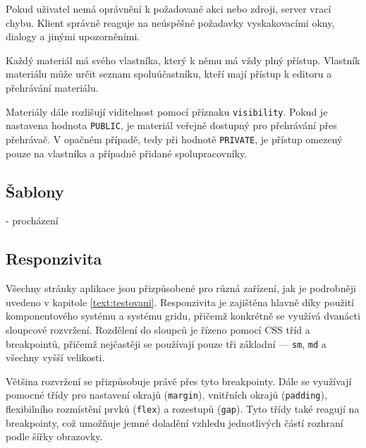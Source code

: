 Pokud uživatel nemá oprávnění k požadované akci nebo zdroji, server vrací chybu. 
Klient správně reaguje na neúspěšné požadavky vyskakovacími okny, dialogy a jinými upozorněními.

Každý materiál má svého vlastníka, který k němu má vždy plný přístup. 
Vlastník materiálu může určit seznam spoluúčastníku, kteří mají přístup k editoru a přehrávání materiálu.

Materiály dále rozlišují viditelnost pomocí příznaku \texttt{visibility}. 
Pokud je nastavena hodnota \texttt{PUBLIC}, je materiál veřejně dostupný pro přehrávání přes přehrávač. 
V opačném případě, tedy při hodnotě \texttt{PRIVATE}, je přístup omezený pouze na vlastníka a případně přidané spolupracovníky.



\subsection{Šablony}

- procházení

\subsection{Responzivita}


Všechny stránky aplikace jsou přizpůsobené pro různá zařízení, jak je podrobněji uvedeno v kapitole \ref{text:testovani}. 
Responzivita je zajištěna hlavně díky použití komponentového systému a systému gridu, přičemž konkrétně se využívá dvanácti sloupcové rozvržení. 
Rozdělení do sloupců je řízeno pomocí CSS tříd a breakpointů, přičemž nejčastěji se používají pouze tři základní — \texttt{sm}, \texttt{md} a všechny vyšší velikosti.

Většina rozvržení se přizpůsobuje právě přes tyto breakpointy. 
Dále se využívají pomocné třídy pro nastavení okrajů (\texttt{margin}), vnitřních okrajů (\texttt{padding}), flexibilního rozmístění prvků (\texttt{flex}) a rozestupů (\texttt{gap}). 
Tyto třídy také reagují na breakpointy, což umožňuje jemné doladění vzhledu jednotlivých částí rozhraní podle šířky obrazovky.

